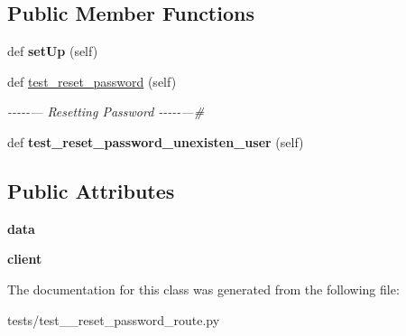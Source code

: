 \subsection*{Public Member Functions}
\begin{DoxyCompactItemize}
\item 
\mbox{\label{classtests_1_1test__8__reset__password__route_1_1_test_user_routes_ae26c2b25da8d3f5c41924afb5708e375}} 
def {\bfseries set\+Up} (self)
\item 
\mbox{\label{classtests_1_1test__8__reset__password__route_1_1_test_user_routes_a05d3de481cd5cf98e885ad5f439f90cc}} 
def \hyperlink{classtests_1_1test__8__reset__password__route_1_1_test_user_routes_a05d3de481cd5cf98e885ad5f439f90cc}{test\+\_\+reset\+\_\+password} (self)
\begin{DoxyCompactList}\small\item\em -\/-\/-\/-\/-\/--- Resetting Password -\/-\/-\/-\/-\/---\# \end{DoxyCompactList}\item 
\mbox{\label{classtests_1_1test__8__reset__password__route_1_1_test_user_routes_aff97624968826b2eed98da2d9d5cf467}} 
def {\bfseries test\+\_\+reset\+\_\+password\+\_\+unexisten\+\_\+user} (self)
\end{DoxyCompactItemize}
\subsection*{Public Attributes}
\begin{DoxyCompactItemize}
\item 
\mbox{\label{classtests_1_1test__8__reset__password__route_1_1_test_user_routes_a0aa4fc0d0e27b018a7d54e4d916e9c52}} 
{\bfseries data}
\item 
\mbox{\label{classtests_1_1test__8__reset__password__route_1_1_test_user_routes_affae0ec0c0fc2ab301a4bda35a73b2eb}} 
{\bfseries client}
\end{DoxyCompactItemize}


The documentation for this class was generated from the following file\+:\begin{DoxyCompactItemize}
\item 
tests/test\+\_\+\_\+reset\+\_\+password\+\_\+route.\+py\end{DoxyCompactItemize}
